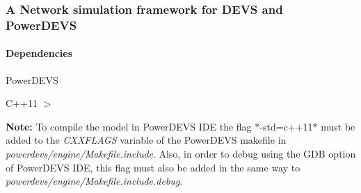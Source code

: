 \subsubsection*{A Network simulation framework for D\+E\+VS and Power\+D\+E\+VS}

\paragraph*{Dependencies}


\begin{DoxyEnumerate}
\item Power\+D\+E\+VS
\item C++11 $>$
\end{DoxyEnumerate}

{\bfseries Note\+:} To compile the model in Power\+D\+E\+VS I\+DE the flag $\ast$-\/std=c++11$\ast$ must be added to the {\itshape C\+X\+X\+F\+L\+A\+GS} variable of the Power\+D\+E\+VS makefile in {\itshape powerdevs/engine/\+Makefile.\+include}. Also, in order to debug using the G\+DB option of Power\+D\+E\+VS I\+DE, this flag must also be added in the same way to {\itshape powerdevs/engine/\+Makefile.\+include.\+debug}. 
